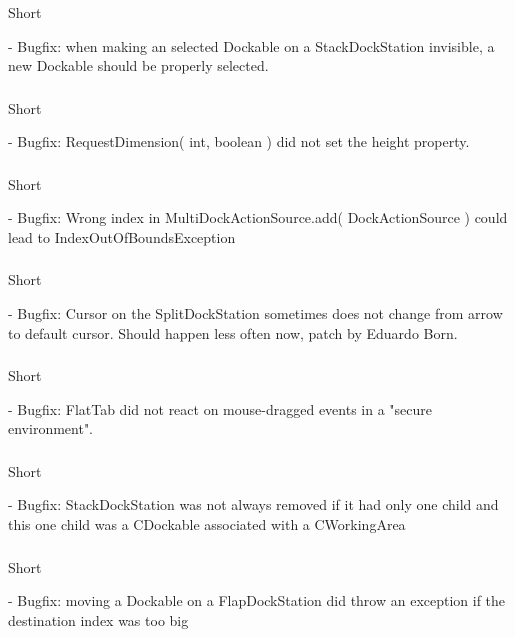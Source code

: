 \documentclass[a4paper,10pt]{article}
\newcommand{\short}{\item[Short]}
\begin{document}
\subsubsection{}
\begin{description}
 \short 
\end{description}
- Bugfix: when making an selected Dockable on a StackDockStation invisible, a new Dockable should be properly selected.
\subsubsection{}
\begin{description}
 \short 
\end{description}
- Bugfix: RequestDimension( int, boolean ) did not set the height property.
\subsubsection{}
\begin{description}
 \short 
\end{description}
- Bugfix: Wrong index in MultiDockActionSource.add( DockActionSource ) could lead to IndexOutOfBoundsException
\subsubsection{}
\begin{description}
 \short 
\end{description}
- Bugfix: Cursor on the SplitDockStation sometimes does not change from arrow to default cursor. Should happen less often now, patch by Eduardo Born.
\subsubsection{}
\begin{description}
 \short 
\end{description}
- Bugfix: FlatTab did not react on mouse-dragged events in a "secure environment".
\subsubsection{}
\begin{description}
 \short 
\end{description}
- Bugfix: StackDockStation was not always removed if it had only one child and this one child was a CDockable associated with a CWorkingArea
\subsubsection{}
\begin{description}
 \short 
\end{description}
- Bugfix: moving a Dockable on a FlapDockStation did throw an exception if the destination index was too big
\end{document}
